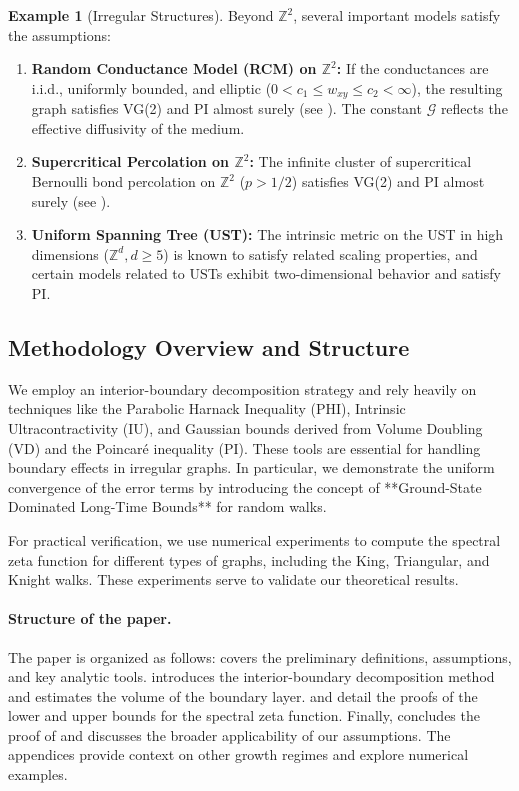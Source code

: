 \documentclass{article}
\numberwithin{equation}{section}
\theoremstyle{definition}
\newtheorem{example}[theorem]{Example}
\theoremstyle{remark}
\newcommand{\cG}{\mathcal{G}}    %
\begin{document}
\begin{example}[Irregular Structures]\label{ex:irregular}
Beyond $\mathbb{Z}^2$, several important models satisfy the assumptions:
\begin{enumerate}
    \item \textbf{Random Conductance Model (RCM) on $\mathbb{Z}^2$:} If the conductances are i.i.d., uniformly bounded, and elliptic ($0 < c_1 \leq w_{xy} \leq c_2 < \infty$), the resulting graph satisfies VG(2) and PI almost surely (see \cite{Biskup11}). The constant $\cG$ reflects the effective diffusivity of the medium.
    \item \textbf{Supercritical Percolation on $\mathbb{Z}^2$:} The infinite cluster of supercritical Bernoulli bond percolation on $\mathbb{Z}^2$ ($p>1/2$) satisfies VG(2) and PI almost surely (see \cite{Barlow04}).
    \item \textbf{Uniform Spanning Tree (UST):} The intrinsic metric on the UST in high dimensions ($\mathbb{Z}^d, d\geq 5$) is known to satisfy related scaling properties, and certain models related to USTs exhibit two-dimensional behavior and satisfy PI.
\end{enumerate}
\end{example}


\subsection{Methodology Overview and Structure}
We employ an interior-boundary decomposition strategy and rely heavily on techniques like the Parabolic Harnack Inequality (PHI), Intrinsic Ultracontractivity (IU), and Gaussian bounds derived from Volume Doubling (VD) and the Poincaré inequality (PI). These tools are essential for handling boundary effects in irregular graphs. In particular, we demonstrate the uniform convergence of the error terms by introducing the concept of **Ground-State Dominated Long-Time Bounds** for random walks.

For practical verification, we use numerical experiments to compute the spectral zeta function for different types of graphs, including the King, Triangular, and Knight walks. These experiments serve to validate our theoretical results.

\paragraph{Structure of the paper.} 
The paper is organized as follows:
 covers the preliminary definitions, assumptions, and key analytic tools.  introduces the interior-boundary decomposition method and estimates the volume of the boundary layer.  and  detail the proofs of the lower and upper bounds for the spectral zeta function. Finally,  concludes the proof of  and discusses the broader applicability of our assumptions. The appendices provide context on other growth regimes and explore numerical examples.
\end{document}
